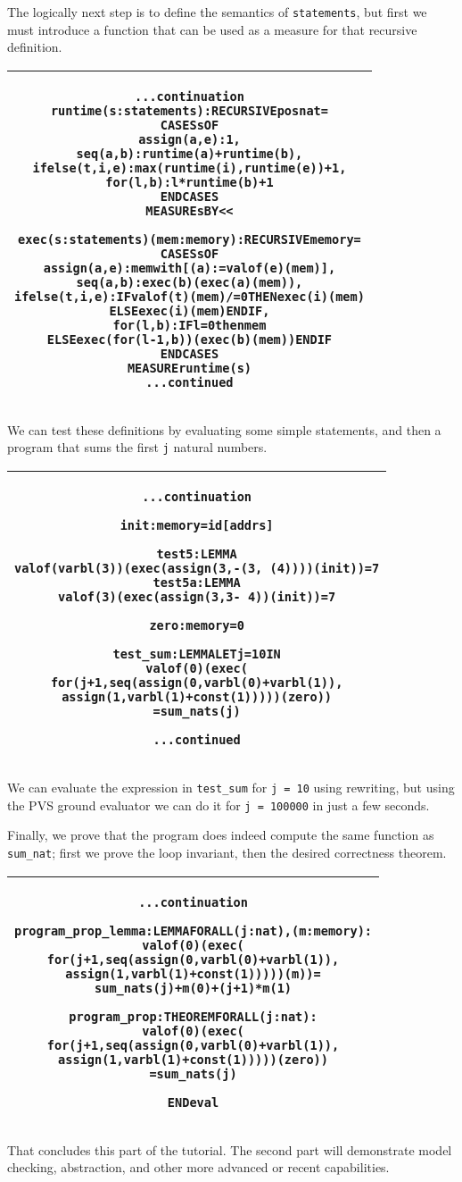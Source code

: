 \documentclass[11pt,twoside]{article}
\makeatletter
\def\sessionsize{\small}
\newlength{\hsbw}
\newenvironment{session}{\begin{flushleft}
  \def\baselinestretch{1}
 \setlength{\hsbw}{\linewidth}
 \addtolength{\hsbw}{-\arrayrulewidth}
 \addtolength{\hsbw}{-\tabcolsep}
 \begin{tabular}{@{}|c@{}|@{}}\hline 
 \begin{minipage}[b]{\hsbw}
 \begingroup\sessionsize\vspace*{1.2ex}\begin{alltt}}{\end{alltt}\endgroup\end{minipage}\\ \hline
 \end{tabular}
 \end{flushleft}}
\makeatother
\begin{document}
The logically next step is to define the semantics of
{\tt statements}, but first we must introduce a function that can be used as
a measure for that recursive definition.

\begin{session}
...continuation
  runtime(s: statements): RECURSIVE posnat =
  CASES s OF
    assign(a, e):  1,
    seq(a, b):     runtime(a) + runtime(b),
    ifelse(t,i,e): max(runtime(i),runtime(e))+1,
    for(l,b):      l*runtime(b)+1
  ENDCASES
  MEASURE s BY <<

  exec(s: statements)(mem: memory): RECURSIVE memory = 
  CASES s OF
    assign(a, e):  mem with [(a) := valof(e)(mem)],
    seq(a, b):     exec(b)(exec(a)(mem)),
    ifelse(t,i,e): IF valof(t)(mem) /= 0 THEN exec(i)(mem) 
                   ELSE exec(i)(mem) ENDIF,
    for(l,b):      IF l = 0 then mem 
                   ELSE exec(for(l-1,b))(exec(b)(mem)) ENDIF
  ENDCASES 
  MEASURE runtime(s)
...continued
\end{session}

We can test these definitions by evaluating some simple statements,
and then a program that sums the first {\tt j} natural numbers.

\begin{session}
...continuation

  init: memory = id[addrs]

  test5: LEMMA 
    valof(varbl(3))(exec(assign(3, -(3, ~(4))))(init)) = 7
  test5a: LEMMA 
    valof(3)(exec(assign(3, 3 - ~4))(init)) = 7

  zero: memory = 0 %

  test_sum: LEMMA LET j = 10 IN
    valof(0)(exec(
         for(j+1,seq(assign(0, varbl(0) + varbl(1)),
                     assign(1, varbl(1) + const(1)))))(zero))
      = sum_nats(j)

...continued
\end{session}

We can evaluate the expression in {\tt test\_sum} for {\tt j = 10}
using rewriting, but using the PVS ground evaluator we can do it for
{\tt j = 100000} in just a few seconds.

Finally, we prove that the program does indeed compute the same
function as {\tt sum\_nat}; first we prove the loop invariant, then the
desired correctness theorem.

\begin{session}
...continuation

  program_prop_lemma: LEMMA  FORALL (j:nat),(m:memory):
    valof(0)(exec(
         for(j+1,seq(assign(0, varbl(0) + varbl(1)),
                     assign(1, varbl(1) + const(1)))))(m)) = 
         sum_nats(j) + m(0) + (j+1)*m(1)

  program_prop: THEOREM  FORALL (j:nat):
    valof(0)(exec(
         for(j+1,seq(assign(0, varbl(0) + varbl(1)),
                     assign(1, varbl(1) + const(1)))))(zero))
      = sum_nats(j)

END eval
\end{session}

That concludes this part of the tutorial.   The second part will
demonstrate model checking, abstraction, and other more advanced or
recent capabilities.




\end{document}
